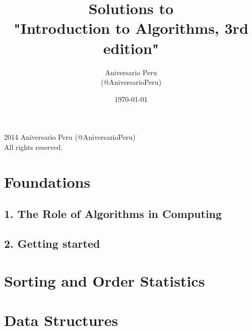 \documentclass[11pt]{book}
\title{Solutions to\\"Introduction to Algorithms, 3rd edition"}
\author{Aniversario Peru\\(@AniversarioPeru)}
\date{\today}
\begin{document}
\frontmatter
\maketitle


\noindent\textcopyright{} 2014 Aniversario Peru (@AniversarioPeru)\\
All rights reserved.\\


\part{Foundations}

\chapter{1. The Role of Algorithms in Computing}


\chapter{2. Getting started}




\part{Sorting and Order Statistics}

\part{Data Structures}

\backmatter

\listoffigures
\listoftables
\end{document}
